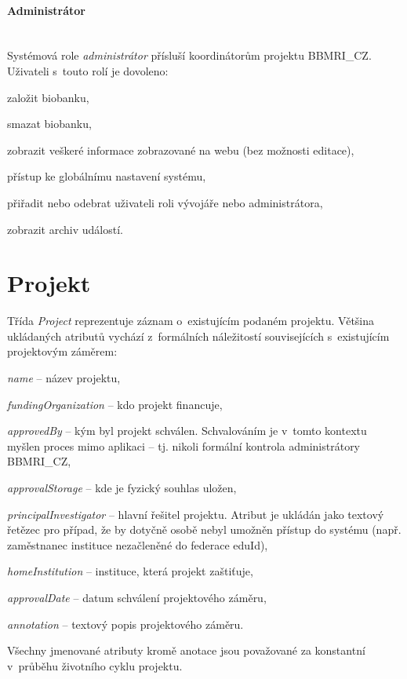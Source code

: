 \documentclass[11pt, final, oneside]{fithesis2}
\newcommand{\paragraphNewLine}[1]{\paragraph*{#1}\mbox{}\\}
\newcommand{\ProjectName}{\mbox{BBMRI\_CZ}\xspace}
\begin{document}
\paragraphNewLine{Administrátor}
Systémová role \textit{administrátor} přísluší koordinátorům projektu \ProjectName.
Uživateli s~touto rolí je dovoleno:
\begin{compactitem}
	\item založit biobanku, 
	\item smazat biobanku,
	\item zobrazit veškeré informace zobrazované na webu (bez možnosti editace),
	\item přístup ke globálnímu nastavení systému,
	\item přiřadit nebo odebrat uživateli roli vývojáře nebo administrátora,
	\item zobrazit archiv událostí.
\end{compactitem}

\section{Projekt}
Třída \textit{Project} reprezentuje záznam o~existujícím podaném projektu. Většina ukládaných atributů vychází z~formálních náležitostí souvisejících s~existujícím projektovým záměrem:
\begin{compactitem}
	\item \textit{name} -- název projektu,
	\item \textit{fundingOrganization} -- kdo projekt financuje,	
	\item \textit{approvedBy} -- kým byl projekt schválen. Schvalováním je v~tomto kontextu myšlen proces mimo aplikaci -- tj. nikoli formální kontrola administrátory \ProjectName,
	\item \textit{approvalStorage} -- kde je fyzický souhlas uložen,
	\item \textit{principalInvestigator} -- hlavní řešitel projektu. Atribut je ukládán jako textový řetězec pro případ, že by dotyčně osobě nebyl umožněn přístup do systému (např. zaměstnanec instituce nezačleněné do federace eduId),
	\item \textit{homeInstitution} -- instituce, která projekt zaštiťuje,
	\item \textit{approvalDate} -- datum schválení projektového záměru,
	\item \textit{annotation} -- textový popis projektového záměru.
\end{compactitem}
Všechny jmenované atributy kromě anotace jsou považované za konstantní v~průběhu životního cyklu projektu. 
\end{document}
